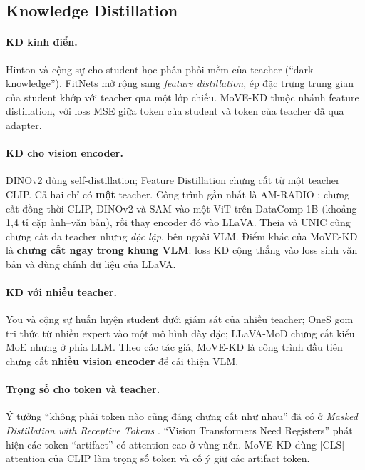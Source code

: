 \documentclass[11pt,a4paper]{article}
\begin{document}
\subsection{Knowledge Distillation}

\paragraph{KD kinh điển.} Hinton và cộng sự \cite{hinton} cho student học phân phối mềm của teacher (``dark knowledge''). FitNets \cite{fitnets} mở rộng sang \emph{feature distillation}, ép đặc trưng trung gian của student khớp với teacher qua một lớp chiếu. MoVE-KD thuộc nhánh feature distillation, với loss MSE giữa token của student và token của teacher đã qua adapter.

\paragraph{KD cho vision encoder.} DINOv2 \cite{dinov2} dùng self-distillation; Feature Distillation \cite{fd} chưng cất từ một teacher CLIP. Cả hai chỉ có \textbf{một} teacher. Công trình gần nhất là AM-RADIO \cite{radio}: chưng cất đồng thời CLIP, DINOv2 và SAM vào một ViT trên DataComp-1B (khoảng 1,4 tỉ cặp ảnh--văn bản), rồi thay encoder đó vào LLaVA. Theia và UNIC \cite{theia} cũng chưng cất đa teacher nhưng \emph{độc lập}, bên ngoài VLM. Điểm khác của MoVE-KD là \textbf{chưng cất ngay trong khung VLM}: loss KD cộng thẳng vào loss sinh văn bản và dùng chính dữ liệu của LLaVA.

\paragraph{KD với nhiều teacher.} You và cộng sự \cite{multiteacher} huấn luyện student dưới giám sát của nhiều teacher; OneS \cite{ones} gom tri thức từ nhiều expert vào một mô hình dày đặc; LLaVA-MoD \cite{llavamod} chưng cất kiểu MoE nhưng ở phía LLM. Theo các tác giả, MoVE-KD là công trình đầu tiên chưng cất \textbf{nhiều vision encoder} để cải thiện VLM.

\paragraph{Trọng số cho token và teacher.} Ý tưởng ``không phải token nào cũng đáng chưng cất như nhau'' đã có ở \emph{Masked Distillation with Receptive Tokens} \cite{mdrt}. ``Vision Transformers Need Registers'' \cite{registers} phát hiện các token ``artifact'' có attention cao ở vùng nền. MoVE-KD dùng [CLS] attention của CLIP làm trọng số token và cố ý giữ các artifact token.
\end{document}
